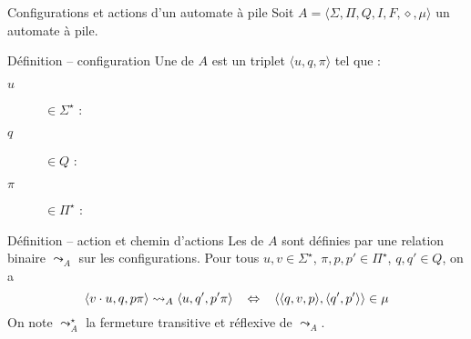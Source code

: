 \begin{frame}{Configurations et actions d'un automate à pile}
  Soit $A=\langle \Sigma, \Pi, Q, I, F, \diamond, \mu \rangle$ un automate à pile. 
  
  \begin{block}{Définition -- configuration}
    Une  de $A$ est un triplet \alert{$\langle u, q, \pi \rangle$} tel que :
    \begin{description}
    \item[\alert{$u$}] $\in \Sigma^\star$ : 
    \item[\alert{$q$}] $\in Q$ : 
    \item[\alert{$\pi$}] $\in \Pi^\star$ : 
    \end{description}
  \end{block}

  \begin{block}{Définition -- action et chemin d'actions}
    Les  de $A$ sont définies par une
    relation binaire \alert{$\leadsto_A$} sur les configurations.
    Pour tous $u, v \in \Sigma^\star$, $\pi, p, p' \in \Pi^\star$, $q, q'\in Q$, on a 
    \alert{$$\langle v \cdot u, q, p \pi \rangle \leadsto_A \langle u, q', p' \pi \rangle \hspace{3mm} \Leftrightarrow \hspace{3mm} \langle \langle q, v, p \rangle, \langle q', p' \rangle \rangle \in \mu$$}
    On note \alert{$\leadsto_A^\star$} la fermeture transitive et réflexive de $\leadsto_A$.
  \end{block}
\end{frame}

